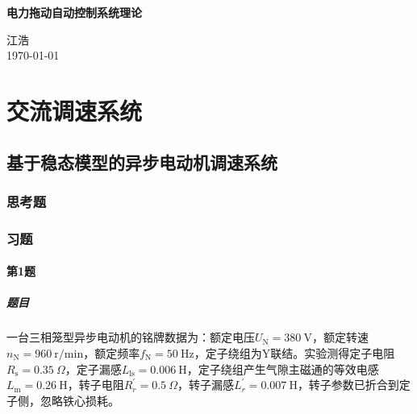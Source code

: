 \documentclass[12pt, a4paper, UTF8, fontset=adobe, oneside]{ctexbook} %
\begin{document}
\frontmatter
\begin{titlepage}
\begin{center}

\vspace*{5cm}
{\huge \bfseries 电力拖动自动控制系统理论}\\[0.4cm]

\vspace{12cm}

{\large 江浩} \\[1cm]
{\large \today}

\end{center}
\end{titlepage}

\begin{titlepage}
\begin{center}

\end{center}
\end{titlepage}

{
\hypersetup{linkcolor=black} %
\tableofcontents %
}

\mainmatter %

\part{交流调速系统}

\chapter{基于稳态模型的异步电动机调速系统}

\section{思考题}

\section{习题}
\subsection{第1题}
\subsubsection{题目}
一台三相笼型异步电动机的铭牌数据为：额定电压$U_{\mathrm{N}}=380\ \mathrm{V}$，额定转速$n_{\mathrm{N}}=960\ \mathrm{r/min}$，额定频率$f_{\mathrm{N}}=50\ \mathrm{Hz}$，定子绕组为Y联结。实验测得定子电阻$R_{\mathrm{s}}=0.35\ \Omega$，定子漏感$L_{\mathrm{ls}}=0.006\ \mathrm{H}$，定子绕组产生气隙主磁通的等效电感$L_{\mathrm{m}}=0.26\ \mathrm{H}$，转子电阻$R_r^{'}=0.5\ \Omega$，转子漏感$L_{r}^{'}=0.007\ \mathrm{H}$，转子参数已折合到定子侧，忽略铁心损耗。
\end{document}
